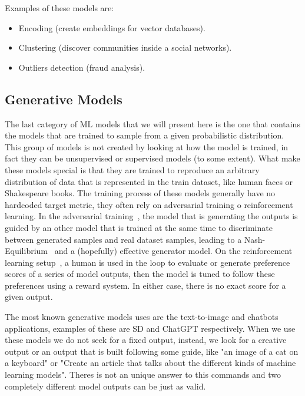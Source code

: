 Examples of these models are:
\begin{itemize}
    \item Encoding (create embeddings for vector databases).
    \item Clustering (discover communities inside a social networks).
    \item Outliers detection (fraud analysis).
\end{itemize}

\subsection{Generative Models}

The last category of \gls{ML} models that we will present here is the one that contains the models that are trained to sample from a given probabilistic distribution. This group of models is not created by looking at how the model is trained, in fact they can be unsupervised or supervised models (to some extent). What make these models special is that they are trained to reproduce an arbitrary distribution of data that is represented in the train dataset, like human faces or Shakespeare books. The training process of these models generally have no hardcoded target metric, they often rely on adversarial training o reinforcement learning. In the adversarial training~\cite{goodfellow2020generative}, the model that is generating the outputs is guided by an other model that is trained at the same time to discriminate between generated samples and real dataset samples, leading to a Nash-Equilibrium~\cite{nash1950equilibrium} and a (hopefully) effective generator model. On the reinforcement learning setup~\cite{russell2016artificial}, a human is used in the loop to evaluate or generate preference scores of a series of model outputs, then the model is tuned to follow these preferences using a reward system. In either case, there is no exact score for a given output.

The most known generative models uses are the text-to-image and chatbots applications, examples of these are \gls{SD} and ChatGPT respectively. When we use these models we do not seek for a fixed output, instead, we look for a creative output or an output that is built following some guide, like "an image of a cat on a keyboard" or "Create an article that talks about the different kinds of machine learning models". Theres is not an unique answer to this commands and two completely different model outputs can be just as valid.

